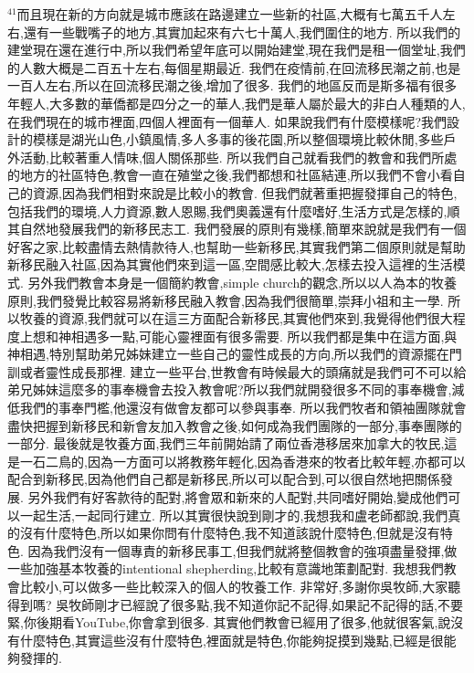 \documentclass{book}
\begin{document}
$^{41}$而且現在新的方向就是城市應該在路邊建立一些新的社區,大概有七萬五千人左右,還有一些戰嘴子的地方,其實加起來有六七十萬人,我們圍住的地方.
所以我們的建堂現在還在進行中,所以我們希望年底可以開始建堂,現在我們是租一個堂址,我們的人數大概是二百五十左右,每個星期最近.
我們在疫情前,在回流移民潮之前,也是一百人左右,所以在回流移民潮之後,增加了很多.
我們的地區反而是斯多福有很多年輕人,大多數的華僑都是四分之一的華人,我們是華人屬於最大的非白人種類的人,在我們現在的城市裡面,四個人裡面有一個華人.
如果說我們有什麼模樣呢?我們設計的模樣是湖光山色,小鎮風情,多人多事的後花園,所以整個環境比較休閒,多些戶外活動,比較著重人情味,個人關係那些.
所以我們自己就看我們的教會和我們所處的地方的社區特色,教會一直在殖堂之後,我們都想和社區結連,所以我們不會小看自己的資源,因為我們相對來說是比較小的教會.
但我們就著重把握發揮自己的特色,包括我們的環境,人力資源,數人恩賜,我們奧義還有什麼嗜好,生活方式是怎樣的,順其自然地發展我們的新移民志工.
我們發展的原則有幾樣,簡單來說就是我們有一個好客之家,比較盡情去熱情款待人,也幫助一些新移民,其實我們第二個原則就是幫助新移民融入社區,因為其實他們來到這一區,空間感比較大,怎樣去投入這裡的生活模式.
另外我們教會本身是一個簡約教會,simple church的觀念,所以以人為本的牧養原則,我們發覺比較容易將新移民融入教會,因為我們很簡單,崇拜小祖和主一學.
所以牧養的資源,我們就可以在這三方面配合新移民,其實他們來到,我覺得他們很大程度上想和神相遇多一點,可能心靈裡面有很多需要.
所以我們都是集中在這方面,與神相遇,特別幫助弟兄姊妹建立一些自己的靈性成長的方向,所以我們的資源擺在門訓或者靈性成長那裡.
建立一些平台,世教會有時候最大的頭痛就是我們可不可以給弟兄姊妹這麼多的事奉機會去投入教會呢?所以我們就開發很多不同的事奉機會,減低我們的事奉門檻,他還沒有做會友都可以參與事奉.
所以我們牧者和領袖團隊就會盡快把握到新移民和新會友加入教會之後,如何成為我們團隊的一部分,事奉團隊的一部分.
最後就是牧養方面,我們三年前開始請了兩位香港移居來加拿大的牧民,這是一石二鳥的,因為一方面可以將教務年輕化,因為香港來的牧者比較年輕,亦都可以配合到新移民,因為他們自己都是新移民,所以可以配合到,可以很自然地把關係發展.
另外我們有好客款待的配對,將會眾和新來的人配對,共同嗜好開始,變成他們可以一起生活,一起同行建立.
所以其實很快說到剛才的,我想我和盧老師都說,我們真的沒有什麼特色,所以如果你問有什麼特色,我不知道該說什麼特色,但就是沒有特色.
因為我們沒有一個專責的新移民事工,但我們就將整個教會的強項盡量發揮,做一些加強基本牧養的intentional shepherding,比較有意識地策劃配對.
我想我們教會比較小,可以做多一些比較深入的個人的牧養工作.
非常好,多謝你吳牧師,大家聽得到嗎? 吳牧師剛才已經說了很多點,我不知道你記不記得,如果記不記得的話,不要緊,你後期看YouTube,你會拿到很多.
其實他們教會已經用了很多,他就很客氣,說沒有什麼特色,其實這些沒有什麼特色,裡面就是特色,你能夠捉摸到幾點,已經是很能夠發揮的.
\end{document}
